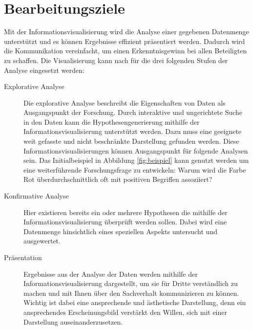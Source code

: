 \documentclass[a4paper, 
               12pt,
               DIV=calc,
               version=first,
               pdftex,
               headsepline,
               footsepline,
               bibtotocnumbered,
               liststotocnumbered]{scrreprt}
\begin{document}
\section{Bearbeitungsziele}
\label{sec:Ziele}
Mit der Informationsvisualisierung wird die Analyse einer gegebenen Datenmenge unterstützt und
es können Ergebnisse effizient präsentiert werden. Dadurch wird die Kommunikation vereinfacht,
um einen Erkenntnisgewinn bei allen Beteiligten zu schaffen.
Die Visualisierung kann nach \citep{Schumann} für die drei folgenden Stufen der Analyse eingesetzt werden:
\begin{description}
\item[Explorative Analyse]
Die explorative Analyse beschreibt die Eigenschaften von Daten als Ausgangspunkt der Forschung.
Durch interaktive und ungerichtete Suche in den Daten
kann die Hypothesengenerierung mithilfe der Informationsvisualisierung unterstützt werden. Dazu muss eine
geeignete weit gefasste und nicht beschränkte Darstellung gefunden werden. Diese Informationsvisualisierungen
können Ausgangspunkt für folgende Analysen sein. Das Initialbeispiel in Abbildung \ref{fig:beispiel} kann
genutzt werden um eine weiterführende Forschungsfrage zu entwickeln: Warum wird die Farbe Rot überdurchschnittlich
oft mit positiven Begriffen assoziiert?
\item[Konfirmative Analyse]
Hier existieren bereits ein oder mehrere Hypothesen die mithilfe der Informationsvisualisierung überprüft werden sollen.
Dabei wird eine Datenmenge hinsichtlich eines speziellen Aspekts untersucht und ausgewertet.
\item[Präsentation]
Ergebnisse aus der Analyse der Daten werden mithilfe der Informationsvisualisierung dargestellt, um sie für Dritte verständlich
zu machen und mit Ihnen über den Sachverhalt kommunizieren zu können.
Wichtig ist dabei eine ansprechende und ästhetische Darstellung, denn
ein ansprechendes Erscheinungsbild verstärkt den Willen, sich mit einer Darstellung auseinanderzusetzen.
\end{description}
\end{document}
